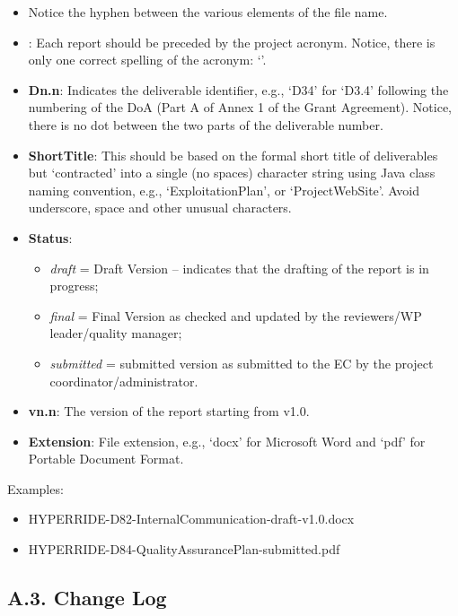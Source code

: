 \begin{itemize}
	\item Notice the hyphen between the various elements of the file name.
	\item {\bf \hyperride{}}: Each \hyperride{} report should be preceded by the project acronym. Notice, there is only one correct spelling of the acronym: ‘\hyperride{}’. 
	\item {\bf Dn.n}: Indicates the deliverable identifier, e.g., ‘D34’ for ‘D3.4’ following the numbering of the \ac{DoA} (Part A of Annex 1 of the Grant Agreement). Notice, there is no dot between the two parts of the deliverable number.
	\item {\bf ShortTitle}: This should be based on the formal short title of deliverables but ‘contracted’ into a single (no spaces) character string using Java class naming convention, e.g., ‘ExploitationPlan’,  or ‘ProjectWebSite’. Avoid underscore, space and other unusual characters.
	\item {\bf Status}: 
	\begin{itemize}
		\item \textit{draft} = Draft Version – indicates that the drafting of the report is in progress; 
		\item \textit{final} = Final Version as checked and updated by the reviewers/WP leader/quality manager; 
		\item \textit{submitted} = submitted version as submitted to the EC by the project coordinator/administrator.
	\end{itemize}
	\item {\bf vn.n}: The version of the report starting from v1.0. 
	\item {\bf Extension}: File extension, e.g., ‘docx’ for Microsoft Word and ‘pdf’ for Portable Document Format. 
\end{itemize}

Examples:

\begin{itemize}
	\item HYPERRIDE-D82-InternalCommunication-draft-v1.0.docx
	\item HYPERRIDE-D84-QualityAssurancePlan-submitted.pdf
\end{itemize}

\subsection*{A.3. Change Log}
\label{sec:appendix-a3-change-log}

